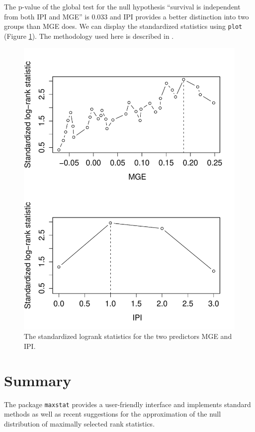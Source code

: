 \documentclass{article}
\begin{document}
The p-value of the global test for the null hypothesis ``survival is
independent from both IPI and MGE'' is 0.033 
and IPI provides a better distinction into two groups than 
MGE does. We can display the
standardized statistics using \texttt{plot} (Figure \ref{plotmmax}). The
methodology used here is described in \cite{lausenetal:2002}.

\begin{figure}[ht]
\begin{center}
\includegraphics{maxstat-mmax-fig}
\caption{The standardized logrank statistics for the two predictors MGE and
IPI. \label{plotmmax}}
\end{center}
\end{figure}

\section{Summary}

The package \texttt{maxstat} provides a user-friendly interface and 
implements standard methods as well as recent suggestions for the 
approximation of the null distribution of maximally selected rank statistics.




\end{document}
